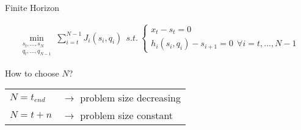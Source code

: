 \begin{frame}{Finite Horizon}

\begin{block}{}
\small{
\begin{align*}
  \min_{\begin{array}{c} s_{t},...,s_{N}\\ q_{t},...,q_{N-1} \end{array}} \sum_{i=t}^{N-1} J_{i}(s_{i},q_{i}) \ \  
  s.t. \ \left\lbrace \begin{array}{c}
  x_{t} - s_{t} = 0 \\
  h_i (s_i ,q_i ) - s_{i+1} = 0 \ \ \forall i = t, ... , N-1 \end{array} \right. 
\end{align*}}
\end{block}
\vspace{1ex}
How to choose $N$? \\
\vspace{1ex}
\begin{tabular}{l l}
$N=t_{end} $ &$ \rightarrow $ problem size decreasing \\ \vspace{1ex}
\onslide<2->
$N=t+n $ & $\rightarrow $ problem size constant \\
\end{tabular}

\end{frame}
%
